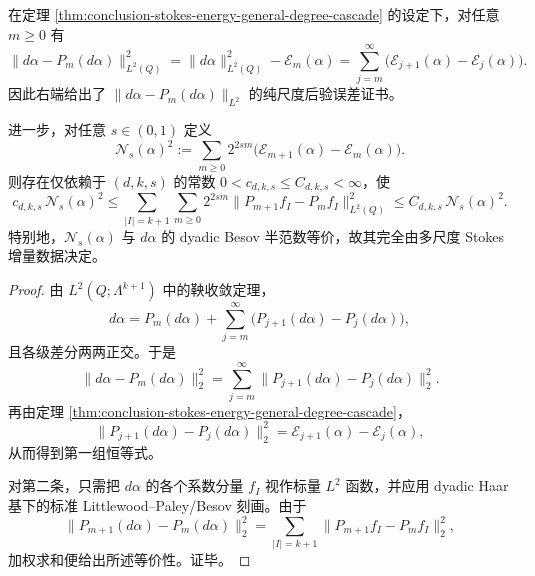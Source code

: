 \begin{corollary}\label{cor:conclusion-stokes-energy-dyadic-besov-readout}
在定理 \ref{thm:conclusion-stokes-energy-general-degree-cascade} 的设定下，对任意 \(m\ge 0\) 有
\[
\|d\alpha-P_m(d\alpha)\|_{L^2(Q)}^2
=
\|d\alpha\|_{L^2(Q)}^2-\mathcal E_m(\alpha)
=
\sum_{j=m}^{\infty}\bigl(\mathcal E_{j+1}(\alpha)-\mathcal E_j(\alpha)\bigr).
\]
因此右端给出了 \(\|d\alpha-P_m(d\alpha)\|_{L^2}\) 的纯尺度后验误差证书。

进一步，对任意 \(s\in(0,1)\) 定义
\[
\mathcal N_s(\alpha)^2
:=
\sum_{m\ge 0}2^{2sm}\bigl(\mathcal E_{m+1}(\alpha)-\mathcal E_m(\alpha)\bigr).
\]
则存在仅依赖于 \((d,k,s)\) 的常数 \(0<c_{d,k,s}\le C_{d,k,s}<\infty\)，使
\[
c_{d,k,s}\,\mathcal N_s(\alpha)^2
\le
\sum_{|I|=k+1}\sum_{m\ge 0}2^{2sm}\|P_{m+1}f_I-P_mf_I\|_{L^2(Q)}^2
\le
C_{d,k,s}\,\mathcal N_s(\alpha)^2.
\]
特别地，\(\mathcal N_s(\alpha)\) 与 \(d\alpha\) 的 dyadic Besov 半范数等价，故其完全由多尺度 Stokes 增量数据决定。
\end{corollary}
\begin{proof}
由 \(L^2(Q;\Lambda^{k+1})\) 中的鞅收敛定理，
\[
d\alpha
=
P_m(d\alpha)+\sum_{j=m}^{\infty}\bigl(P_{j+1}(d\alpha)-P_j(d\alpha)\bigr),
\]
且各级差分两两正交。于是
\[
\|d\alpha-P_m(d\alpha)\|_2^2
=
\sum_{j=m}^{\infty}\|P_{j+1}(d\alpha)-P_j(d\alpha)\|_2^2.
\]
再由定理 \ref{thm:conclusion-stokes-energy-general-degree-cascade}，
\[
\|P_{j+1}(d\alpha)-P_j(d\alpha)\|_2^2
=
\mathcal E_{j+1}(\alpha)-\mathcal E_j(\alpha),
\]
从而得到第一组恒等式。

对第二条，只需把 \(d\alpha\) 的各个系数分量 \(f_I\) 视作标量 \(L^2\) 函数，并应用 dyadic Haar 基下的标准 Littlewood--Paley/Besov 刻画。由于
\[
\|P_{m+1}(d\alpha)-P_m(d\alpha)\|_2^2
=
\sum_{|I|=k+1}\|P_{m+1}f_I-P_mf_I\|_2^2,
\]
加权求和便给出所述等价性。证毕。
\end{proof}

\endinput
